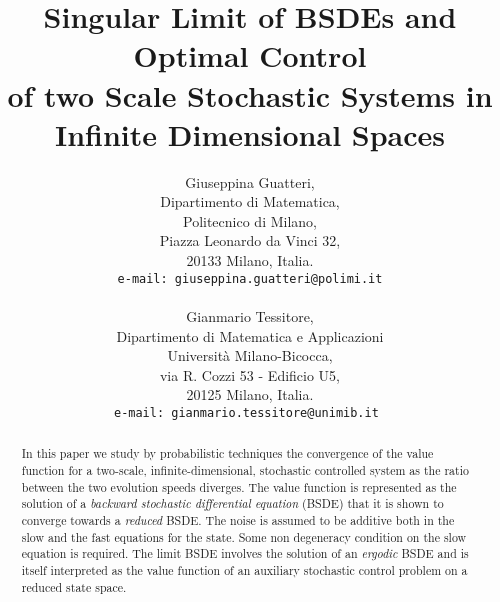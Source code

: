 \documentclass[reqno,a4paper,11 pt]{article}
\numberwithin{equation}{section}
\begin{document}
\thispagestyle{empty}
\parindent=0pt



\title{Singular Limit of BSDEs and Optimal Control \\ of two Scale Stochastic Systems in Infinite Dimensional Spaces}
\author{ %
Giuseppina Guatteri, \\
Dipartimento di Matematica, \\
Politecnico di Milano, \\
Piazza Leonardo da Vinci 32, \\
20133 Milano,
Italia. \\
 {\tt e-mail: giuseppina.guatteri@polimi.it} \\ \\
Gianmario Tessitore,\\
Dipartimento di Matematica e Applicazioni \\
Universit\`{a} Milano-Bicocca, \\
 via R. Cozzi 53 - Edificio U5,\\ 20125 Milano, Italia.\\
{\tt e-mail: gianmario.tessitore@unimib.it
 }} 

\date{}
\maketitle
\begin{abstract}
In this paper we  study by probabilistic techniques the convergence of the value function for a two-scale,  infinite-dimensional, stochastic controlled system  as the ratio between the two evolution speeds diverges. 
The value function is represented as the solution of a \textit{backward stochastic differential equation} (BSDE) that it is shown to converge towards a \textit{reduced} BSDE. The noise is assumed to be additive  both in the slow and the fast equations for the state. Some non degeneracy condition on the slow equation is required. The limit BSDE involves the solution of an \textit{ergodic} BSDE and is itself interpreted as the value function of an auxiliary stochastic control problem on a reduced state space.
\end{abstract}
\end{document}
